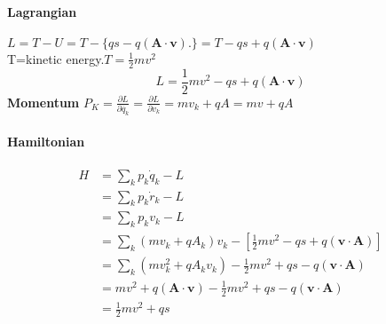 \paragraph{Lagrangian }
$L=T-U=T-\{q s-q(\mathbf{A} \cdot \mathbf{v}) .\}=T-q s+q(\mathbf{A} \cdot \mathbf{v})$\\
T=kinetic energy.$T=\frac{1}{2}mv^2$
$$L=\frac{1}{2}mv^2-q s+q(\mathbf{A} \cdot \mathbf{v})$$
\textbf{Momentum} $P_K=\frac{\partial L}{\partial \dot{q_k}}=\frac{\partial L}{\partial v_k}=mv_k+qA=mv+qA$\\
\paragraph{Hamiltonian}
$$\begin{aligned}
H &=\sum_{k} p_{k} \dot{q}_{k}-L \\
&=\sum_{k} p_{k} \dot{r}_{k}-L \\
&=\sum_{k} p_{k} v_{k}-L \\
&=\sum_{k}\left(m v_{k}+q A_{k}\right) v_{k}-\left[\frac{1}{2} m v^{2}-q s+q(\mathbf{v} \cdot \mathbf{A})\right] \\
&=\sum_{k}\left(m v_{k}^{2}+q A_{k} v_{k}\right)-\frac{1}{2} m v^{2}+q s-q(\mathbf{v} \cdot \mathbf{A}) \\
&=m v^{2}+q(\mathbf{A} \cdot \mathbf{v})-\frac{1}{2} m v^{2}+q s-q(\mathbf{v} \cdot \mathbf{A}) \\
&=\frac{1}{2} m v^{2}+q s
\end{aligned}$$



 
